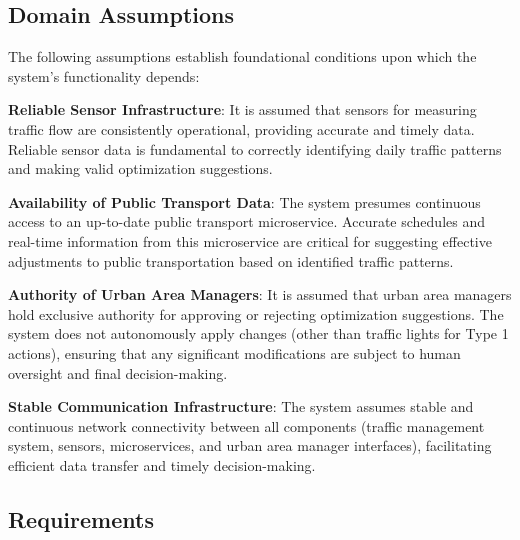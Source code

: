 \documentclass[a4paper,12pt]{article}
\begin{document}
\subsection{Domain Assumptions}
The following assumptions establish foundational conditions upon which the system's functionality depends:
\begin{itmeize}
    \item \textbf{Reliable Sensor Infrastructure}: It is assumed that sensors for measuring traffic flow are consistently operational, providing accurate and timely data. Reliable sensor data is fundamental to correctly identifying daily traffic patterns and making valid optimization suggestions.
    \item \textbf{Availability of Public Transport Data}: The system presumes continuous access to an up-to-date public transport microservice. Accurate schedules and real-time information from this microservice are critical for suggesting effective adjustments to public transportation based on identified traffic patterns.
    \item \textbf{Authority of Urban Area Managers}: It is assumed that urban area managers hold exclusive authority for approving or rejecting optimization suggestions. The system does not autonomously apply changes (other than traffic lights for Type 1 actions), ensuring that any significant modifications are subject to human oversight and final decision-making.
    \item \textbf{Stable Communication Infrastructure}: The system assumes stable and continuous network connectivity between all components (traffic management system, sensors, microservices, and urban area manager interfaces), facilitating efficient data transfer and timely decision-making.
\end{itmeize}

\subsection{Requirements}
\end{document}
